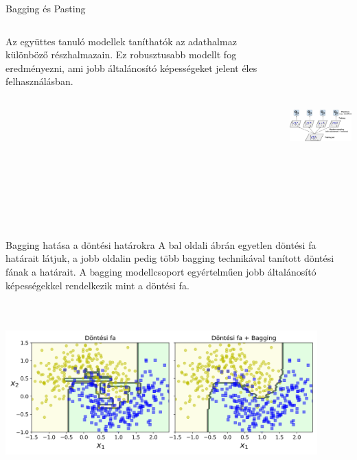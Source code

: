 \documentclass[english, aspectratio=169]{beamer}
\begin{document}
\begin{frame}{Bagging és Pasting}
\begin{columns}
\begin{column}{.5\textwidth}
Az együttes tanuló modellek taníthatók az adathalmaz különböző részhalmazain. Ez robusztusabb modellt fog eredményezni, ami jobb általánosító képességeket jelent éles felhasználásban.
\end{column}
\begin{column}{.5\textwidth}
\begin{center}
\includegraphics[width=7cm, height=7cm, keepaspectratio]{images/ensemble_4.png}
\end{center}
\end{column}
\end{columns}
\end{frame}

\begin{frame}{Bagging hatása a döntési határokra}
A bal oldali ábrán egyetlen döntési fa határait látjuk, a jobb oldalin pedig több bagging technikával tanított döntési fának a határait. A bagging modellcsoport egyértelműen jobb általánosító képességekkel rendelkezik mint a döntési fa.
\begin{center}
\includegraphics[width=12cm, height=7cm, keepaspectratio]{images/ensemble_5.png}
\end{center}
\end{frame}
\end{document}

